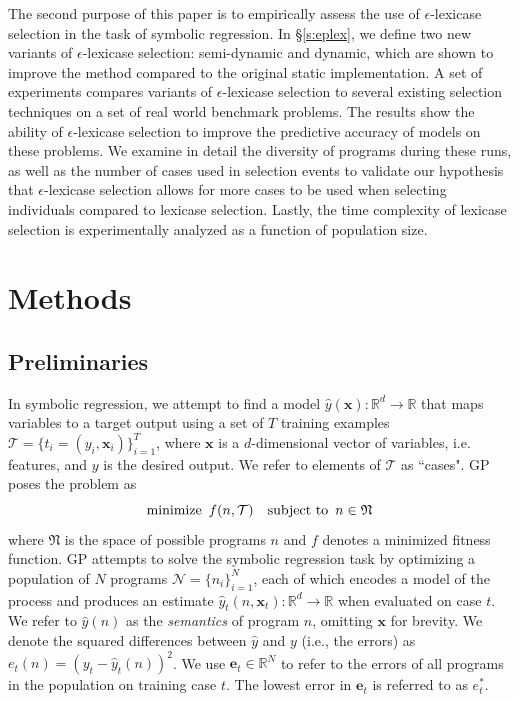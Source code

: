 \documentclass[twoside]{article}
\newcommand{\edit}[1]{{\color{red} #1}}
\begin{document}
The second purpose of this paper is to empirically assess the use of $\epsilon$-lexicase selection in \edit{the task of symbolic regression}. In \S\ref{s:eplex}, we define two new variants of $\epsilon$-lexicase selection: semi-dynamic and dynamic, which are shown to improve the method compared to the original static implementation. A set of experiments compares variants of $\epsilon$-lexicase selection to several existing selection techniques on a set of real world benchmark problems. The results show the ability of $\epsilon$-lexicase selection to improve the predictive accuracy of models on these problems. We examine in detail the diversity of programs during these runs, as well as the number of cases used in selection events to validate our hypothesis that $\epsilon$-lexicase selection allows for more cases to be used when selecting individuals compared to lexicase selection. Lastly, the time complexity of lexicase selection is experimentally analyzed as a function of population size.    

\section{Methods}
\subsection{Preliminaries}
In symbolic regression, we attempt to find a model $\hat{y}(\mathbf{x}): \mathbb{R}^d \rightarrow \mathbb{R}$ that maps variables to a target output using a set of $T$ training examples $\mathcal{T} = \{t_i = (y_i,\mathbf{x}_i)\}_{i=1}^T$, where $\mathbf{x}$ is a $d$-dimensional vector of variables, i.e. features, and $y$ is the desired output. We refer to elements of $\mathcal{T}$ as ``cases". GP poses the problem as
\begin{equation} \label{eq:gp}
\text{minimize} \hspace{0.5em} {f(n,\mathcal{T})} \hspace{1em} \text{subject to} \hspace{0.5em} {n \in \mathfrak{N}}
\end{equation}
where $\mathfrak{N}$ is the space of possible programs $n$ and $f$ denotes a minimized fitness function. GP attempts to solve the symbolic regression task by optimizing a population of $N$ programs $\mathcal{N} = \{n_i\}_{i=1}^N$, each of which encodes a model of the process and produces an estimate  $\hat{y}_t(n,\mathbf{x}_t): \mathbb{R}^d \rightarrow \mathbb{R}$ when evaluated on case $t$. We refer to $\hat{y}(n)$ as the {\it semantics} of program $n$, omitting $\mathbf{x}$ for brevity. We denote the squared differences between $\hat{y}$ and $y$ (i.e., the errors) as $e_t(n) = (y_t - \hat{y}_t(n))^2$.  We use $\mathbf{e}_t \in \mathbb{R}^N$ to refer to the errors of all programs in the population on training case $t$. The lowest error in $\mathbf{e}_t$ is referred to as $e^*_t$. 
\end{document}
